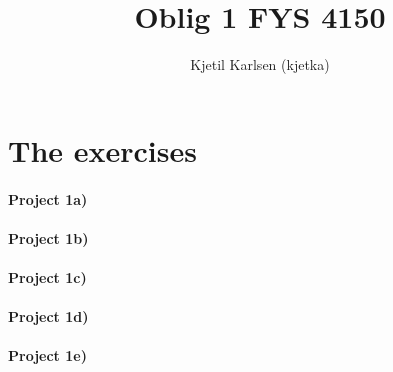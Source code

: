 


\title{Oblig 1 FYS 4150}
\author{Kjetil Karlsen (kjetka)}




\maketitle

\section{The exercises}
\paragraph{Project 1a)}

\paragraph{Project 1b)}

\paragraph{Project 1c)}

\paragraph{Project 1d)}

\paragraph{Project 1e)}



